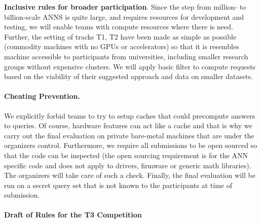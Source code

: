 {\bf Inclusive rules for broader participation}. Since the step from
million- to billion-scale ANNS is quite large, and requires resources
for development and testing, we will enable teams with compute
resources where there is need. Further, the setting of tracks T1, T2
have been made as simple as possible (commodity machines with no GPUs
or accelerators) so that it is resembles machine accessible to
participants from universities, including smaller research groups
without expensive clusters.  We will apply basic filter to compute
requests based on the viability of their suggested approach and data
on smaller datasets.


\paragraph{Cheating Prevention.}

We explicitly forbid teams to try to setup caches that could
precompute answers to queries. Of course, hardware features can act
like a cache and that is why we carry out the final evaluation on
private bare-metal machines that are under the organizers control.
Furthermore, we require all submissions to be open sourced so that the
code can be inspected (the open sourcing requirement is for the ANN
specific code and does not apply to drivers, firmware or generic math
libraries).  The organizers will take care of such a check.  Finally,
the final evaluation will be run on a secret query set that is not
known to the participants at time of submission.


\paragraph{Draft of Rules for the T3 Competition}

